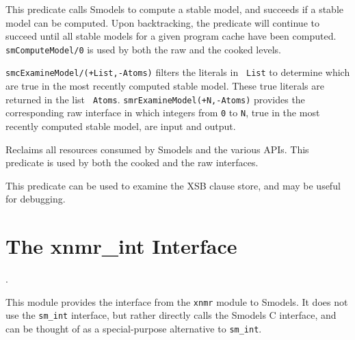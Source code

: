 \begin{description}
%
This predicate calls Smodels to compute a stable model, and succeeds
if a stable model can be computed.  Upon backtracking, the predicate
will continue to succeed until all stable models for a given program
cache have been computed.  {\tt smComputeModel/0} is used by both the
raw and the cooked levels.

%
{\tt smcExamineModel/(+List,-Atoms)} filters the literals in {\tt
  List} to determine which are true in the most recently computed
stable model.  These true literals are returned in the list {\tt
  Atoms}.  {\tt smrExamineModel(+N,-Atoms)} provides the corresponding
raw interface in which integers from {\tt 0} to {\tt N}, true in the
most recently computed stable model, are input and output.

%
Reclaims all resources consumed by Smodels and the various APIs.  This
predicate is used by both the cooked and the raw interfaces.

%
This predicate can be used to examine the XSB clause store, and may
be useful for debugging.

\end{description}

\section{The xnmr\_int Interface}.

This module provides the interface from the {\tt xnmr} module to
Smodels.  It does not use the {\tt sm\_int} interface, but rather
directly calls the Smodels C interface, and can be thought of as a
special-purpose alternative to {\tt sm\_int}.

